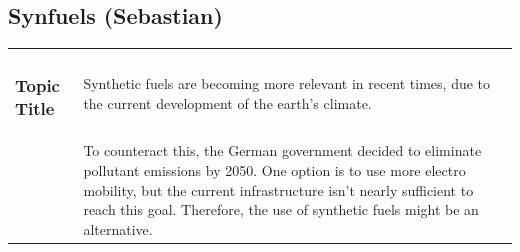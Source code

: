  \subsection{Synfuels (Sebastian)}

 
 \begin{xtabular}{|p{3.8cm}|p{8.3cm}|p{4.2cm}|}
 	\vspace*{-1.25\baselineskip}\subsubsection{Topic Title}
 	& 
 	Synthetic fuels are becoming more relevant in recent times, due to the current development of the earth’s climate. 
 	& 
 	\\
 	
 	&
 	To counteract this, the German government decided to eliminate pollutant emissions by 2050. One option is to use more electro mobility, but the current infrastructure isn't nearly sufficient to reach this goal. Therefore, the use of synthetic fuels might be an alternative.
 	&
 	

\end{xtabular}
